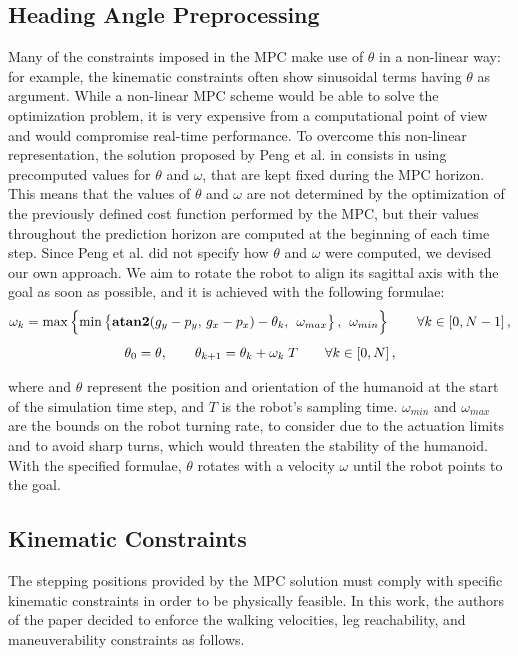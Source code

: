 \subsection{Heading Angle Preprocessing}
Many of the constraints imposed in the MPC make use of $\theta$ in a non-linear way: for example, the kinematic constraints often show sinusoidal terms having $\theta$ as argument. While a non-linear MPC scheme would be able to solve the optimization problem, it is very expensive from a computational point of view and would compromise real-time performance. To overcome this non-linear representation, the solution proposed by Peng et al. in \cite{peng_main_paper} consists in using precomputed values for $\theta$ and $\omega$, that are kept fixed during the MPC horizon.\\
This means that the values of $\theta$ and $\omega$ are not determined by the optimization of the previously defined cost function performed by the MPC, but their values throughout the prediction horizon are computed at the beginning of each time step. Since Peng et al. did not specify how $\theta$ and $\omega$ were computed, we devised our own approach. We aim to rotate the robot to align its sagittal axis with the goal as soon as possible, and it is achieved with the following formulae:
\begin{gather}
\omega_k = \max \left\{ \min \left\{ \operatorname{\textbf{atan2}}(g_y - p_y,\, g_x - p_x) - \theta_k,\, \; \omega_{max} \right\} ,\, \; \omega_{min} \right\} \qquad \forall k \in \left[0, N-1 \right], \notag \\[1ex]
\theta_0 = \theta, \qquad \theta_{k+1} = \theta_{k} + \omega_k\;T \qquad \forall k \in \left[0, N\right], \notag
\end{gather}

where and $\theta$ represent the position and orientation of the humanoid at the start of the simulation time step, and $T$ is the robot's sampling time. $\omega_{min}$ and $\omega_{max}$ are the bounds on the robot turning rate, to consider due to the actuation limits and to avoid sharp turns, which would threaten the stability of the humanoid. With the specified formulae, $\theta$ rotates with a velocity $\omega$ until the robot points to the goal.

\subsection{Kinematic Constraints}
The stepping positions provided by the MPC solution must comply with specific kinematic constraints in order to be physically feasible. In this work, the authors of the paper decided to enforce the walking velocities, leg reachability, and maneuverability constraints as follows.

